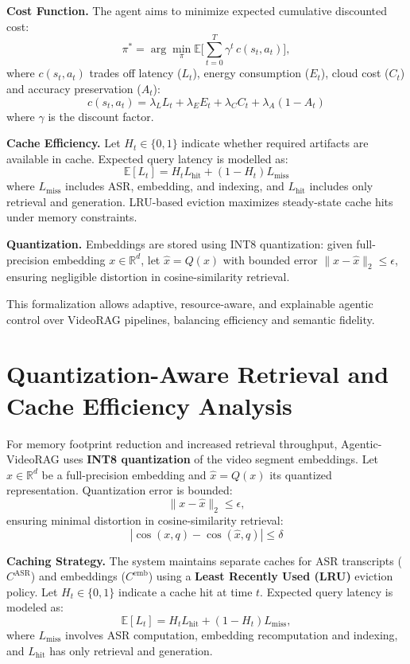 \documentclass[conference,twocolumn]{IEEEtran}
\begin{document}
\textbf{Cost Function.} The agent aims to minimize expected cumulative discounted cost:
\[
\pi^* = \arg\min_{\pi} \mathbb{E}\Big[\sum_{t=0}^{T} \gamma^t \, c(s_t, a_t)\Big],
\]
where $c(s_t,a_t)$ trades off latency ($L_t$), energy consumption ($E_t$), cloud cost ($C_t$) and accuracy preservation ($A_t$):
\[
c(s_t,a_t) = \lambda_L L_t + \lambda_E E_t + \lambda_C C_t + \lambda_A (1 - A_t)
\]
where $\gamma$ is the discount factor.

\textbf{Cache Efficiency.} Let $H_t \in \{0,1\}$ indicate whether required artifacts are available in cache. Expected query latency is modelled as:
\[
\mathbb{E}[L_t] = H_t L_{\text{hit}} + (1 - H_t) L_{\text{miss}}
\]
where $L_{\text{miss}}$ includes ASR, embedding, and indexing, and $L_{\text{hit}}$ includes only retrieval and generation. LRU-based eviction maximizes steady-state cache hits under memory constraints.

\textbf{Quantization.} Embeddings are stored using INT8 quantization: given full-precision embedding $x \in \mathbb{R}^d$, let $\hat{x} = Q(x)$ with bounded error $\|x - \hat{x}\|_2 \le \epsilon$, ensuring negligible distortion in cosine-similarity retrieval.

This formalization allows adaptive, resource-aware, and explainable agentic control over VideoRAG pipelines, balancing efficiency and semantic fidelity.

\section{Quantization-Aware Retrieval and Cache Efficiency Analysis}

For memory footprint reduction and increased retrieval throughput, Agentic-VideoRAG uses \textbf{INT8 quantization} of the video segment embeddings. Let $x \in \mathbb{R}^d$ be a full-precision embedding and $\hat{x} = Q(x)$ its quantized representation. Quantization error is bounded:
\[
\| x - \hat{x} \|_2 \le \epsilon,
\]
ensuring minimal distortion in cosine-similarity retrieval:
\[
|\cos(x, q) - \cos(\hat{x}, q)| \le \delta
\]

\textbf{Caching Strategy.} The system maintains separate caches for ASR transcripts ($C^{\text{ASR}}$) and embeddings ($C^{\text{emb}}$) using a \textbf{Least Recently Used (LRU)} eviction policy. Let $H_t \in \{0,1\}$ indicate a cache hit at time $t$. Expected query latency is modeled as:
\[
\mathbb{E}[L_t] = H_t L_{\text{hit}} + (1 - H_t) L_{\text{miss}},
\]
where $L_{\text{miss}}$ involves ASR computation, embedding recomputation and indexing, and $L_{\text{hit}}$ has only retrieval and generation.
\end{document}
